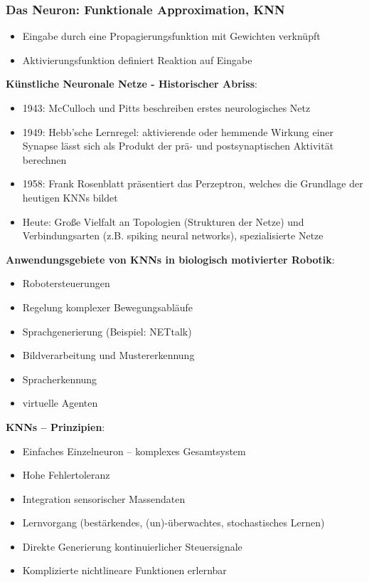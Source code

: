 \subsubsection{Das Neuron: Funktionale Approximation, KNN}
\begin{itemize}
\item Eingabe durch eine Propagierungsfunktion mit Gewichten verknüpft
\item Aktivierungsfunktion definiert Reaktion auf Eingabe
\end{itemize}
\textbf{Künstliche Neuronale Netze - Historischer Abriss}:
\begin{itemize}
\item 1943: McCulloch und Pitts beschreiben erstes neurologisches Netz
\item 1949: Hebb'sche Lernregel: aktivierende oder hemmende Wirkung einer Synapse lässt sich als Produkt der prä-
und postsynaptischen Aktivität berechnen
\item 1958: Frank Rosenblatt präsentiert das Perzeptron, welches die Grundlage der heutigen KNNs bildet
\item Heute: Große Vielfalt an Topologien (Strukturen der Netze) und Verbindungsarten (z.B. \glqq spiking neural networks\grqq), spezialisierte Netze
\end{itemize}
\textbf{Anwendungsgebiete von KNNs in biologisch motivierter Robotik}:
\begin{itemize}
\item Robotersteuerungen
\item Regelung komplexer Bewegungsabläufe
\item Sprachgenerierung (Beispiel: NETtalk)
\item Bildverarbeitung und Mustererkennung
\item Spracherkennung
\item virtuelle Agenten
\end{itemize}
\textbf{KNNs -- Prinzipien}:
\begin{itemize}
\item Einfaches Einzelneuron – komplexes Gesamtsystem
\item Hohe Fehlertoleranz
\item Integration sensorischer Massendaten
\item Lernvorgang (bestärkendes, (un)-überwachtes, stochastisches Lernen)
\item Direkte Generierung kontinuierlicher Steuersignale
\item Komplizierte nichtlineare Funktionen erlernbar
\end{itemize}
